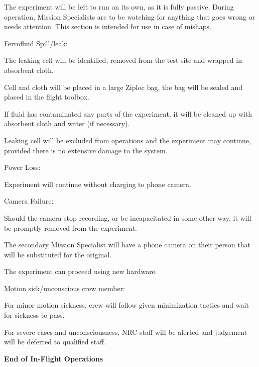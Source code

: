 \begin{checklist}

	\item The experiment will be left to run on its own, as it is fully passive. During operation, Mission Specialists are to be watching for anything that goes wrong or needs attention. This section is intended for use in case of mishaps.
	\item Ferrofluid Spill/leak:
    \begin{checklist}
		\item The leaking cell will be identified, removed from the test site and wrapped in absorbent cloth.
		\item Cell and cloth will be placed in a large Ziploc bag, the bag will be sealed and placed in the flight toolbox.
		\item If fluid has contaminated any parts of the experiment, it will be cleaned up with absorbent cloth and water (if necessary).
		\item Leaking cell will be excluded from operations and the experiment may continue, provided there is no extensive damage to the system.
    \end{checklist}
	\item Power Loss:
    \begin{checklist}
        \item Experiment will continue without charging to phone camera.
    \end{checklist}
	\item Camera Failure:
    \begin{checklist}
		\item Should the camera stop recording, or be incapacitated in some other way, it will be promptly removed from the experiment.
		\item The secondary Mission Specialist will have a phone camera on their person that will be substituted for the original.
		\item The experiment can proceed using new hardware.
    \end{checklist}
	\item Motion sick/unconscious crew member:
    \begin{checklist}
		\item For minor motion sickness, crew will follow given minimization tactics and wait for sickness to pass.
		\item For severe cases and unconsciousness, NRC staff will be alerted and judgement will be deferred to qualified staff.
    \end{checklist}
\end{checklist}
\textbf{End of In-Flight Operations}




